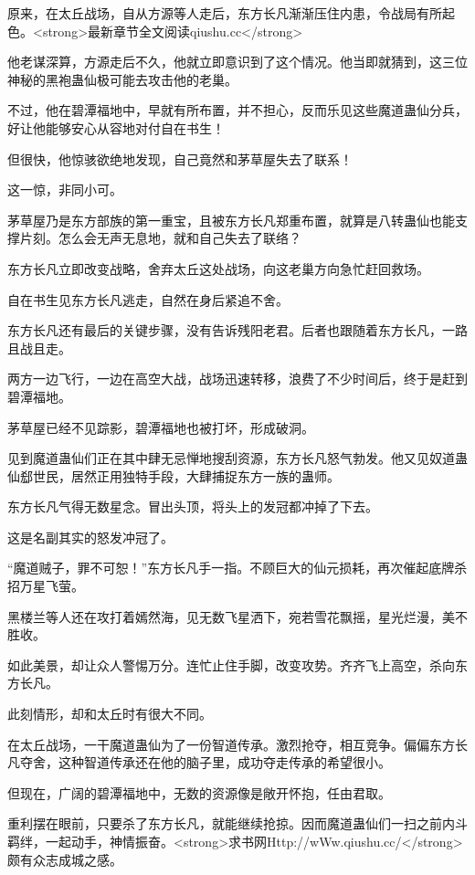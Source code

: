 
\begin{this_body}

原来，在太丘战场，自从方源等人走后，东方长凡渐渐压住内患，令战局有所起色。<strong>最新章节全文阅读qiushu.cc</strong>

他老谋深算，方源走后不久，他就立即意识到了这个情况。他当即就猜到，这三位神秘的黑袍蛊仙极可能去攻击他的老巢。

不过，他在碧潭福地中，早就有所布置，并不担心，反而乐见这些魔道蛊仙分兵，好让他能够安心从容地对付自在书生！

但很快，他惊骇欲绝地发现，自己竟然和茅草屋失去了联系！

这一惊，非同小可。

茅草屋乃是东方部族的第一重宝，且被东方长凡郑重布置，就算是八转蛊仙也能支撑片刻。怎么会无声无息地，就和自己失去了联络？

东方长凡立即改变战略，舍弃太丘这处战场，向这老巢方向急忙赶回救场。

自在书生见东方长凡逃走，自然在身后紧追不舍。

东方长凡还有最后的关键步骤，没有告诉残阳老君。后者也跟随着东方长凡，一路且战且走。

两方一边飞行，一边在高空大战，战场迅速转移，浪费了不少时间后，终于是赶到碧潭福地。

茅草屋已经不见踪影，碧潭福地也被打坏，形成破洞。

见到魔道蛊仙们正在其中肆无忌惮地搜刮资源，东方长凡怒气勃发。他又见奴道蛊仙郄世民，居然正用独特手段，大肆捕捉东方一族的蛊师。

东方长凡气得无数星念。冒出头顶，将头上的发冠都冲掉了下去。

这是名副其实的怒发冲冠了。

“魔道贼子，罪不可恕！”东方长凡手一指。不顾巨大的仙元损耗，再次催起底牌杀招万星飞萤。

黑楼兰等人还在攻打着嫣然海，见无数飞星洒下，宛若雪花飘摇，星光烂漫，美不胜收。

如此美景，却让众人警惕万分。连忙止住手脚，改变攻势。齐齐飞上高空，杀向东方长凡。

此刻情形，却和太丘时有很大不同。

在太丘战场，一干魔道蛊仙为了一份智道传承。激烈抢夺，相互竞争。偏偏东方长凡夺舍，这种智道传承还在他的脑子里，成功夺走传承的希望很小。

但现在，广阔的碧潭福地中，无数的资源像是敞开怀抱，任由君取。

重利摆在眼前，只要杀了东方长凡，就能继续抢掠。因而魔道蛊仙们一扫之前内斗羁绊，一起动手，神情振奋。<strong>求书网Http://wWw.qiushu.cc/</strong>颇有众志成城之感。


\end{this_body}
